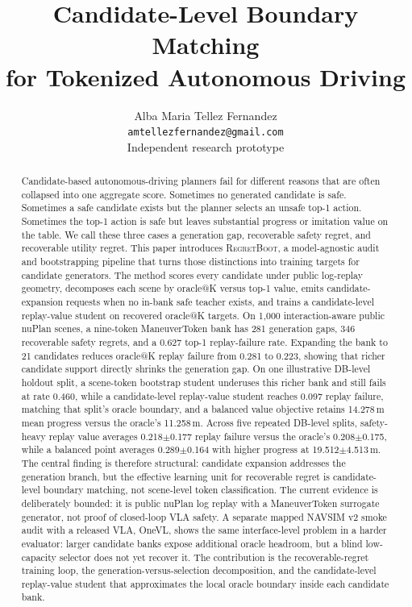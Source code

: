 \documentclass{article}
\title{Candidate-Level Boundary Matching\\for Tokenized Autonomous Driving}
\author{
  Alba Maria Tellez Fernandez\\
  \texttt{amtellezfernandez@gmail.com}\\
  Independent research prototype
}
\newcommand{\method}{\textsc{RegretBoot}}
\begin{document}
\maketitle

\begin{abstract}
Candidate-based autonomous-driving planners fail for different reasons that are often
collapsed into one aggregate score. Sometimes no generated candidate is safe. Sometimes a
safe candidate exists but the planner selects an unsafe top-1 action. Sometimes the top-1
action is safe but leaves substantial progress or imitation value on the table. We call
these three cases a generation gap, recoverable safety regret, and recoverable utility
regret. This paper introduces \method, a model-agnostic audit and bootstrapping pipeline
that turns those distinctions into training targets for candidate generators. The method
scores every candidate under public log-replay geometry, decomposes each scene by
oracle@K versus top-1 value, emits candidate-expansion requests when no in-bank safe
teacher exists, and trains a candidate-level replay-value student on recovered oracle@K
targets. On 1,000 interaction-aware public nuPlan scenes, a nine-token ManeuverToken bank
has 281 generation gaps, 346 recoverable safety regrets, and a 0.627 top-1 replay-failure
rate. Expanding the bank to 21 candidates reduces oracle@K replay failure from 0.281 to
0.223, showing that richer candidate support directly shrinks the generation gap. On one
illustrative DB-level holdout split, a scene-token bootstrap student underuses this richer
bank and still fails at rate 0.460, while a candidate-level replay-value student reaches
0.097 replay failure, matching that split's oracle boundary, and a balanced value
objective retains 14.278\,m mean progress versus the oracle's 11.258\,m. Across five
repeated DB-level splits, safety-heavy replay value averages 0.218$\pm$0.177 replay
failure versus the oracle's 0.208$\pm$0.175, while a balanced point averages
0.289$\pm$0.164 with higher progress at 19.512$\pm$4.513\,m. The central finding is
therefore structural: candidate expansion addresses the generation branch, but the
effective learning unit for recoverable regret is candidate-level boundary matching, not
scene-level token classification. The current evidence is deliberately bounded: it is
public nuPlan log replay with a ManeuverToken surrogate generator, not proof of
closed-loop VLA safety. A separate mapped NAVSIM v2 smoke audit with a released VLA,
OneVL, shows the same interface-level problem in a harder evaluator: larger candidate
banks expose additional oracle headroom, but a blind low-capacity selector does not yet
recover it. The contribution is the recoverable-regret training loop, the
generation-versus-selection decomposition, and the candidate-level replay-value student
that approximates the local oracle boundary inside each candidate bank.
\end{abstract}
\end{document}
